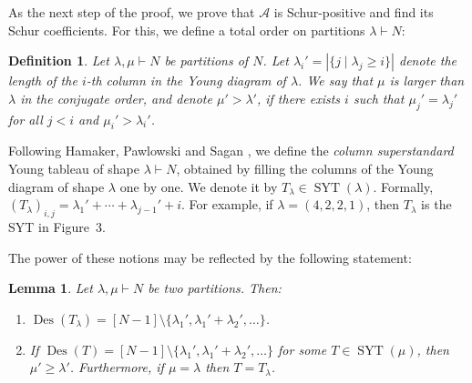 \documentclass[11pt]{article}
\newtheorem{definition}[theo]{Definition}
\newtheorem{lemma}[theo]{Lemma}
\theoremstyle{definition}
\numberwithin{equation}{section}
\newcommand{\Des}{\operatorname{Des}}
\newcommand{\Syt}{\operatorname{SYT}}
\newcommand{\A}{\mathcal{A}}
\begin{document}
As the next step of the proof, we prove that $\A$ is Schur-positive and find its Schur coefficients. For this, we define a total order on partitions $\lambda \vdash N$:
\begin{definition}
\label{def:conjugate order}
    Let $\lambda, \mu \vdash N$ be partitions of $N$. Let $\lambda_i' = |\{j \mid \lambda_j \ge i\}|$ denote the length of the $i$-th column in the Young diagram of $\lambda$. We say that $\mu$ is \emph{larger} than $\lambda$ in the \emph{conjugate order}, and denote $\mu' > \lambda'$, if there exists $i$ such that $\mu_j' = \lambda_j'$ for all $j < i$ and $\mu_i' > \lambda_i'$.
\end{definition}

Following Hamaker, Pawlowski and Sagan \cite[Section 5]{S3_patterns_list}, we define the \emph{column superstandard} Young tableau of shape $\lambda \vdash N$, obtained by filling the columns of the Young diagram of shape $\lambda$ one by one. We denote it by $T_\lambda \in \Syt(\lambda)$.
Formally, $(T_\lambda)_{i,j} = \lambda_1' + \cdots + \lambda_{j-1}' + i$. For example, if $\lambda = (4,2,2,1)$, then $T_\lambda$ is the SYT in Figure~3.


The power of these notions may be reflected by the following statement:
\begin{lemma}
\label{lem:superstandard characterize coefficients}
    Let $\lambda, \mu \vdash N$ be two partitions. Then:
    \begin{enumerate}
        \item $\Des(T_\lambda) = [N-1] \setminus \{\lambda_{1}', \lambda_{1}'+\lambda_{2}', \dots\}$.
        \item If $\Des(T) = [N-1] \setminus \{\lambda_{1}', \lambda_{1}'+\lambda_{2}', \dots\}$ for some $T \in \Syt(\mu)$, then $\mu' \ge \lambda'$. Furthermore, if $\mu = \lambda$ then $T = T_\lambda$.
    \end{enumerate}
\end{lemma}
    
    
\end{document}
